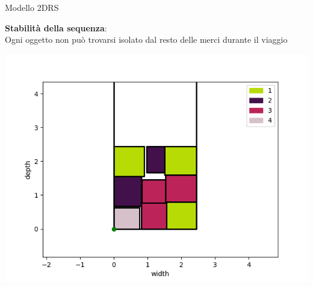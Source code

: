 \documentclass{beamer}
\begin{document}
\begin{frame}{Modello 2DRS}
	\begin{minipage}[c]{0.45\textwidth}
		\textbf{Stabilit\`a della sequenza}:\\ Ogni oggetto non pu\`o trovarsi isolato dal resto delle merci durante il viaggio
	\end{minipage}
	\hfill
	\begin{minipage}[c]{0.45\textwidth}
		\includegraphics[width=1\linewidth]{figures/2d3d}
	\end{minipage}
\end{frame}
\end{document}
